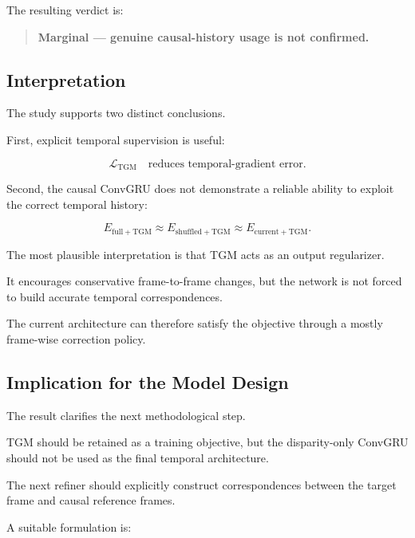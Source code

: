 \documentclass[11pt,a4paper]{article}
\begin{document}
The resulting verdict is:

\begin{quote}
\textbf{Marginal --- genuine causal-history usage is not confirmed.}
\end{quote}

\subsection{Interpretation}

The study supports two distinct conclusions.

First, explicit temporal supervision is useful:

\begin{equation}
\mathcal{L}_{\mathrm{TGM}}
\quad
\text{reduces temporal-gradient error}.
\end{equation}

Second, the causal ConvGRU does not demonstrate a reliable ability to exploit the
correct temporal history:

\begin{equation}
E_{\mathrm{full+TGM}}
\approx
E_{\mathrm{shuffled+TGM}}
\approx
E_{\mathrm{current+TGM}}.
\end{equation}

The most plausible interpretation is that TGM acts as an output regularizer.

It encourages conservative frame-to-frame changes, but the network is not forced to
build accurate temporal correspondences.

The current architecture can therefore satisfy the objective through a mostly
frame-wise correction policy.

\subsection{Implication for the Model Design}

The result clarifies the next methodological step.

TGM should be retained as a training objective, but the disparity-only ConvGRU
should not be used as the final temporal architecture.

The next refiner should explicitly construct correspondences between the target
frame and causal reference frames.

A suitable formulation is:
\end{document}
